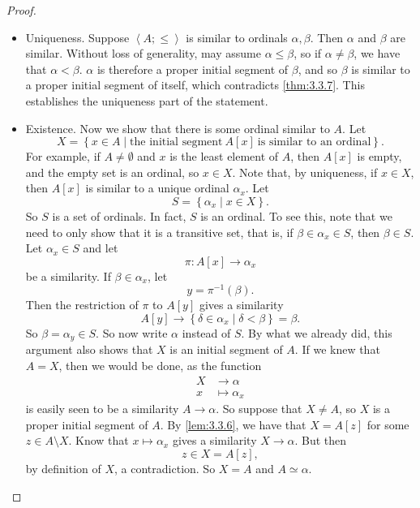\documentclass{article}
\newcommand{\rb}[1]{\left( #1 \right)}
\renewcommand{\sb}[1]{\left[ #1 \right]}
\newcommand{\cb}[1]{\left\{ #1 \right\}}
\newcommand{\ab}[1]{\left\langle #1 \right\rangle}
\theoremstyle{definition}\newtheorem{definition}{Definition}[subsection]
\theoremstyle{definition}\newtheorem{remark1}[definition]{Remark}
\theoremstyle{definition}\newtheorem{example1}[definition]{Example}
\theoremstyle{definition}\newtheorem*{remark2}{Remark}
\theoremstyle{definition}\newtheorem*{example2}{Example}
\theoremstyle{definition}\newtheorem*{note}{Note}
\theoremstyle{definition}\newtheorem*{notation}{Notation}
\begin{document}
\begin{proof}
\hfill
\begin{itemize}
\item Uniqueness. Suppose $ \ab{A; \le} $ is similar to ordinals $ \alpha, \beta $. Then $ \alpha $ and $ \beta $ are similar. Without loss of generality, may assume $ \alpha \le \beta $, so if $ \alpha \ne \beta $, we have that $ \alpha < \beta $. $ \alpha $ is therefore a proper initial segment of $ \beta $, and so $ \beta $ is similar to a proper initial segment of itself, which contradicts \ref{thm:3.3.7}. This establishes the uniqueness part of the statement.
\item Existence. Now we show that there is some ordinal similar to $ A $. Let
$$ X = \cb{x \in A \mid \text{the initial segment} \ A\sb{x} \ \text{is similar to an ordinal}}. $$
For example, if $ A \ne \emptyset $ and $ x $ is the least element of $ A $, then $ A\sb{x} $ is empty, and the empty set is an ordinal, so $ x \in X $. Note that, by uniqueness, if $ x \in X $, then $ A\sb{x} $ is similar to a unique ordinal $ \alpha_x $. Let
$$ S = \cb{\alpha_x \mid x \in X}. $$
So $ S $ is a set of ordinals. In fact, $ S $ is an ordinal. To see this, note that we need to only show that it is a transitive set, that is, if $ \beta \in \alpha_x \in S $, then $ \beta \in S $. Let $ \alpha_x \in S $ and let
$$ \pi : A\sb{x} \to \alpha_x $$
be a similarity. If $ \beta \in \alpha_x $, let
$$ y = \pi^{-1}\rb{\beta}. $$
Then the restriction of $ \pi $ to $ A\sb{y} $ gives a similarity
$$ A\sb{y} \to \cb{\delta \in \alpha_x \mid \delta < \beta} = \beta. $$
So $ \beta = \alpha_y \in S $. So now write $ \alpha $ instead of $ S $. By what we already did, this argument also shows that $ X $ is an initial segment of $ A $. If we knew that $ A = X $, then we would be done, as the function
\begin{align*}
X & \to \alpha \\
x & \mapsto \alpha_x
\end{align*}
is easily seen to be a similarity $ A \to \alpha $. So suppose that $ X \ne A $, so $ X $ is a proper initial segment of $ A $. By \ref{lem:3.3.6}, we have that $ X = A\sb{z} $ for some $ z \in A \setminus X $. Know that $ x \mapsto \alpha_x $ gives a similarity $ X \to \alpha $. But then
$$ z \in X = A\sb{z}, $$
by definition of $ X $, a contradiction. So $ X = A $ and $ A \simeq \alpha $.
\end{itemize}
\end{proof}

\end{document}

